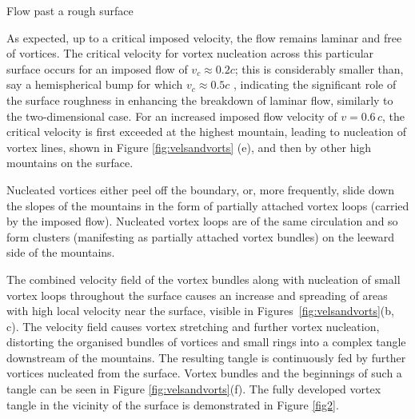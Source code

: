 \begin{chapter}{\label{cha:afm}Flow past a rough surface}
\begin{figure}
{%
}
 \end{figure} 

As expected, up to a critical imposed velocity, the flow remains laminar and free of vortices.  The critical velocity for vortex nucleation across this particular surface occurs for an imposed flow of $v_c\approx 0.2 c$; this is considerably smaller than, say a hemispherical bump for which $v_c \approx 0.5 c$ \cite{win01},  indicating the significant role of the surface roughness in enhancing the breakdown of laminar flow, similarly to the two-dimensional case. For an increased imposed flow velocity of $v=0.6\,c$, the critical velocity is first exceeded at the highest mountain, leading to nucleation of vortex lines, shown in Figure \ref{fig:velsandvorts} (e), and then by other high mountains on the surface.

Nucleated vortices either peel off the boundary, or, more frequently, slide
down the slopes of the mountains in the form of partially attached vortex loops (carried by the imposed flow). Nucleated vortex loops are of the same circulation and so form clusters (manifesting as partially attached vortex bundles) on the leeward side of the mountains.

The combined velocity field of the vortex bundles along with nucleation of small vortex loops throughout the surface causes an increase and spreading of areas with high local velocity near the surface, visible in Figures~\ref{fig:velsandvorts}(b, c). The velocity field causes vortex stretching and further vortex nucleation, distorting the organised bundles of vortices and small rings into a complex tangle downstream of the mountains. The resulting tangle is continuously fed by further vortices nucleated from the surface. Vortex bundles and the beginnings of such a tangle can be seen in Figure \ref{fig:velsandvorts}(f). The fully developed vortex tangle in the vicinity of the surface is demonstrated in Figure \ref{fig2}.


\end{chapter}
